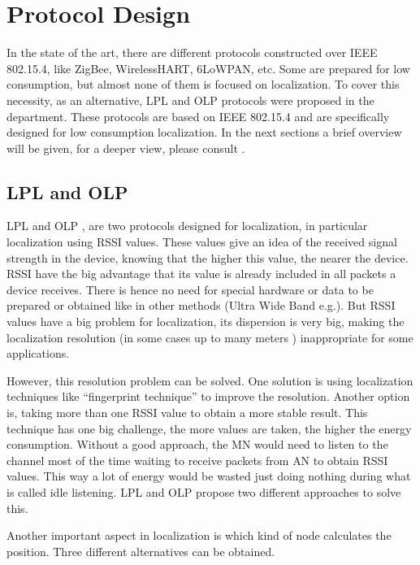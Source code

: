 \chapter{Protocol Design}
\label{chap:protocoldesign}

In the state of the art, there are different protocols constructed over \ac{IEEE} 802.15.4, like ZigBee, WirelessHART, 6LoWPAN, etc. Some
are prepared for low consumption, but almost none of them is focused on localization. To cover this necessity, as an alternative, 
\ac{LPL} and \ac{OLP} \cite{LPLandOLP} protocols were proposed in the department. These protocols are based on 
\ac{IEEE} 802.15.4 and are specifically designed for low consumption localization. In the next sections a brief overview will be given, 
for a deeper view, please consult \cite{LPLandOLP}.

\section{\ac{LPL} and \ac{OLP}}

\ac{LPL} and \ac{OLP} \cite{LPLandOLP}, are two protocols designed for localization, in particular localization using \ac{RSSI} 
values. These values give an idea of the received signal strength in the device, knowing that the higher this value,
the nearer the device. \ac{RSSI} have the big advantage that its value is already included in all packets a device receives. There
is hence no need for special hardware or data to be prepared or obtained like in other methods (Ultra Wide Band e.g.). But \ac{RSSI} 
values have a big problem for localization, its dispersion is very big, making the localization resolution (in some cases up to 
many meters \cite{fingerprint}) inappropriate for some applications. 

However, this resolution problem can be solved. One solution is using localization techniques like ``fingerprint 
technique'' \cite{fingerprint} to improve the resolution. Another option is, taking more than one \ac{RSSI} value to obtain a more stable 
result. This technique has one big challenge, the more values are taken, the higher the energy consumption. Without a good approach, 
the \ac{MN} would need to listen to the channel most of the time waiting to receive packets from \ac{AN} to obtain \ac{RSSI} values. 
This way a lot of energy would be wasted just doing nothing during what is called idle listening. \ac{LPL} and \ac{OLP} propose two different 
approaches to solve this.

Another important aspect in localization is which kind of node calculates the position. Three different alternatives can be obtained.

